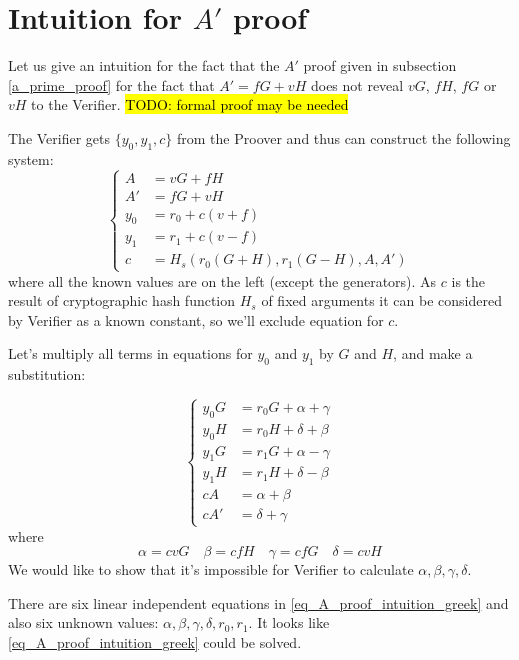\documentclass{article}
\numberwithin{figure}{section}
\begin{document}
\newpage
\section{Intuition for $A'$ proof} \label{s_A'_proof_intuition}

Let us give an intuition for the fact that the $A'$ proof given in subsection \ref{a_prime_proof} for the fact that $A' = fG + vH$  does not reveal $vG$, $fH$, $fG$ or $vH$ to the Verifier. \hl{TODO: formal proof may be needed}

The Verifier gets $\{y_0, y_1, c\}$ from the Proover and thus can construct the following system: 
\begin{equation*} %
    \left\{ \begin{aligned} 
        A &= vG + fH \\
        A' &= fG + vH \\
        y_0 &= r_0 + c (v + f) \\
        y_1 &= r_1 + c (v - f) \\
        c &= H_s(r_0(G+H), r_1(G-H), A, A')
    \end{aligned} \right.
\end{equation*}
where all the known values are on the left (except the generators). As $c$ is the result of cryptographic hash function $H_s$ of fixed arguments it can be considered by Verifier as a known constant, so we'll exclude equation for $c$.

Let's multiply all terms in equations for $y_0$ and $y_1$ by $G$ and $H$, and make a substitution:

\begin{equation} \label{eq_A_proof_intuition_greek}
    \left\{ \begin{aligned} 
        y_0 G &= r_0 G + \alpha + \gamma \\
        y_0 H &= r_0 H + \delta + \beta \\
        y_1 G &= r_1 G + \alpha - \gamma \\
        y_1 H &= r_1 H + \delta - \beta \\
        cA &= \alpha + \beta \\
        cA' &= \delta + \gamma
    \end{aligned} \right.
\end{equation}
where
\[
\alpha = cvG \quad \beta = cfH \quad \gamma = cfG \quad \delta = cvH
\]
We would like to show that it's impossible for Verifier to calculate $\alpha, \beta, \gamma, \delta$.

There are six linear independent equations in \eqref{eq_A_proof_intuition_greek} and also six unknown values: $\alpha, \beta, \gamma, \delta, r_0, r_1$. It looks like \eqref{eq_A_proof_intuition_greek} could be solved.
\end{document}
